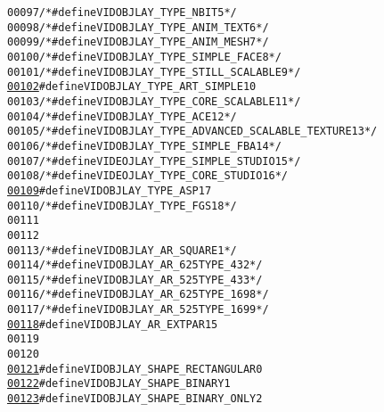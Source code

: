 \begin{footnotesize}
\begin{alltt}
00097 \textcolor{comment}{/*#define VIDOBJLAY\_TYPE\_NBIT                           5 */}
00098 \textcolor{comment}{/*#define VIDOBJLAY\_TYPE\_ANIM\_TEXT                      6 */}
00099 \textcolor{comment}{/*#define VIDOBJLAY\_TYPE\_ANIM\_MESH                      7 */}
00100 \textcolor{comment}{/*#define VIDOBJLAY\_TYPE\_SIMPLE\_FACE            8 */}
00101 \textcolor{comment}{/*#define VIDOBJLAY\_TYPE\_STILL\_SCALABLE         9 */}
\hypertarget{_bitstream_8h_source_l00102}{}\hyperlink{_bitstream_8h_a3aac1a74a15f33d3796fa5da0cb1d7a2}{00102} \textcolor{preprocessor}{#define VIDOBJLAY\_TYPE\_ART\_SIMPLE               10}
00103 \textcolor{preprocessor}{}\textcolor{comment}{/*#define VIDOBJLAY\_TYPE\_CORE\_SCALABLE          11 */}
00104 \textcolor{comment}{/*#define VIDOBJLAY\_TYPE\_ACE                            12 */}
00105 \textcolor{comment}{/*#define VIDOBJLAY\_TYPE\_ADVANCED\_SCALABLE\_TEXTURE 13 */}
00106 \textcolor{comment}{/*#define VIDOBJLAY\_TYPE\_SIMPLE\_FBA                     14 */}
00107 \textcolor{comment}{/*#define VIDEOJLAY\_TYPE\_SIMPLE\_STUDIO    15*/}
00108 \textcolor{comment}{/*#define VIDEOJLAY\_TYPE\_CORE\_STUDIO      16*/}
\hypertarget{_bitstream_8h_source_l00109}{}\hyperlink{_bitstream_8h_a58bd767d5ee49cbf3c6bf514c7f69bd2}{00109} \textcolor{preprocessor}{#define VIDOBJLAY\_TYPE\_ASP              17}
00110 \textcolor{preprocessor}{}\textcolor{comment}{/*#define VIDOBJLAY\_TYPE\_FGS              18*/}
00111 
00112 
00113 \textcolor{comment}{/*#define VIDOBJLAY\_AR\_SQUARE           1 */}
00114 \textcolor{comment}{/*#define VIDOBJLAY\_AR\_625TYPE\_43       2 */}
00115 \textcolor{comment}{/*#define VIDOBJLAY\_AR\_525TYPE\_43       3 */}
00116 \textcolor{comment}{/*#define VIDOBJLAY\_AR\_625TYPE\_169      8 */}
00117 \textcolor{comment}{/*#define VIDOBJLAY\_AR\_525TYPE\_169      9 */}
\hypertarget{_bitstream_8h_source_l00118}{}\hyperlink{_bitstream_8h_a49615f909a819ab6ce89ac208715482e}{00118} \textcolor{preprocessor}{#define VIDOBJLAY\_AR\_EXTPAR                             15}
00119 \textcolor{preprocessor}{}
00120 
\hypertarget{_bitstream_8h_source_l00121}{}\hyperlink{_bitstream_8h_a61a2da7986218293dd7b823a7cce1844}{00121} \textcolor{preprocessor}{#define VIDOBJLAY\_SHAPE\_RECTANGULAR             0}
\hypertarget{_bitstream_8h_source_l00122}{}\hyperlink{_bitstream_8h_aaedb24d8f3e2741a07bcec0275c47e9b}{00122} \textcolor{preprocessor}{}\textcolor{preprocessor}{#define VIDOBJLAY\_SHAPE\_BINARY                  1}
\hypertarget{_bitstream_8h_source_l00123}{}\hyperlink{_bitstream_8h_a412328d1766f979f3d38e477224cc1ee}{00123} \textcolor{preprocessor}{}\textcolor{preprocessor}{#define VIDOBJLAY\_SHAPE\_BINARY\_ONLY             2}

\end{alltt}
\end{footnotesize}
